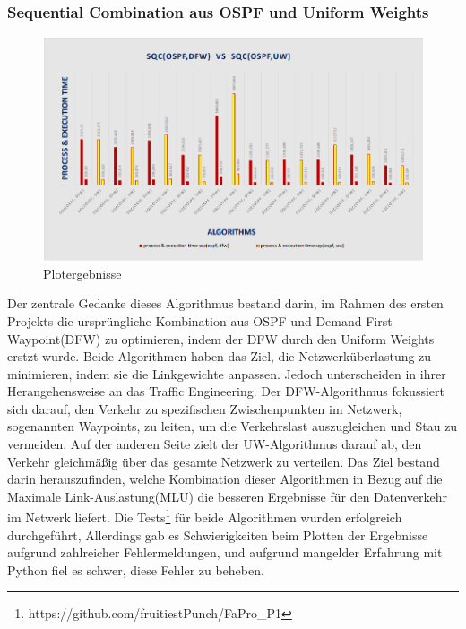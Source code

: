 \documentclass[sigconf, nonacm, review]{acmart}
\begin{document}
\subsubsection{Sequential Combination aus OSPF und Uniform Weights}
\begin{figure}
\centering
\includegraphics[width=\linewidth]{figures/naveed_p1.png}
\caption{Plotergebnisse}
\label{fig:naveed_p1}
\end{figure}
Der zentrale Gedanke dieses  Algorithmus bestand darin, 
im Rahmen des ersten Projekts die urspr\"ungliche Kombination aus OSPF und Demand First Waypoint(DFW)  zu optimieren, 
indem der DFW durch den Uniform Weights erstzt wurde. 
Beide Algorithmen haben das Ziel, die Netzwerk\"uberlastung zu minimieren, indem sie die Linkgewichte anpassen. 
Jedoch unterscheiden in ihrer Herangehensweise an das Traffic Engineering.\newline
Der DFW-Algorithmus fokussiert sich darauf, den Verkehr zu spezifischen Zwischenpunkten im Netzwerk, 
sogenannten Waypoints, zu leiten, um die Verkehrslast auszugleichen und Stau zu vermeiden. 
Auf der anderen Seite zielt der UW-Algorithmus darauf ab, den Verkehr gleichm\"a\ss ig \"uber das gesamte Netzwerk zu verteilen.\newline
Das Ziel bestand darin herauszufinden, 
welche Kombination dieser Algorithmen in Bezug auf die Maximale Link-Auslastung(MLU) die besseren Ergebnisse f\"ur den Datenverkehr im Netwerk liefert.\newline
Die Tests\footnote{https://github.com/fruitiestPunch/FaPro\_P1} f\"ur beide Algorithmen wurden erfolgreich durchgef\"uhrt, Allerdings gab es Schwierigkeiten beim Plotten der Ergebnisse aufgrund zahlreicher Fehlermeldungen, 
und aufgrund mangelder Erfahrung mit Python fiel es schwer, diese Fehler zu beheben.\newline
\end{document}
